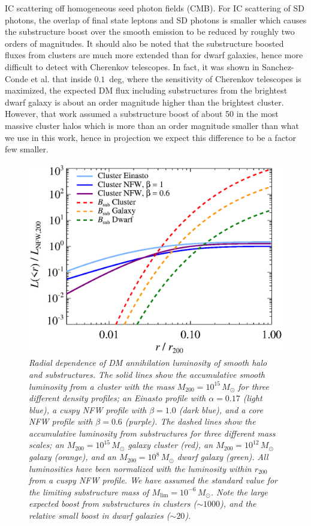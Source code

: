 \documentclass[10pt,aps,pra,reprint,amsmath,amsfonts,amssymb,showpacs,nofootinbib,floatfix]{revtex4-1}
\newcommand{\rmn}{\mathrm}
\newcommand{\msun}{M_\odot}
\newcommand{\rvir}{r_{200}}
\newcommand{\mvir}{M_{200}}
\begin{document}
IC scattering off homogeneous seed photon fields (CMB). For IC
scattering of SD photons, the overlap of final state leptons and SD
photons is smaller which causes the substructure boost over the smooth
emission to be reduced by roughly two orders of magnitudes. It should
also be noted that the substructure boosted fluxes from clusters are
much more extended than for dwarf galaxies, hence more difficult to
detect with Cherenkov telescopes. In fact, it was shown in
Sanchez-Conde et al. \cite{2011arXiv1104.3530S} that inside $0.1$~deg,
where the sensitivity of Cherenkov telescopes is maximized, the
expected DM flux including substructures from the brightest dwarf
galaxy is about an order magnitude higher than the brightest
cluster. However, that work assumed a substructure boost of about 50
in the most massive cluster halos which is more than an order
magnitude smaller than what we use in this work, hence in projection
we expect this difference to be a factor few smaller.

\begin{figure}%
 \includegraphics[width=0.99\columnwidth]{figures/dens.prof.eps}
 \caption{\it Radial dependence of DM annihilation luminosity of
   smooth halo and substructures. The solid lines show the
   accumulative smooth luminosity from a cluster with the mass
   $\mvir=10^{15}\,\msun$ for three different density profiles; an
   Einasto profile with $\alpha=0.17$ (light blue), a cuspy NFW
   profile with $\beta=1.0$ (dark blue), and a core NFW profile with
   $\beta=0.6$ (purple). The dashed lines show the accumulative
   luminosity from substructures for three different mass scales; an
   $\mvir=10^{15}\,\msun$ galaxy cluster (red), an
   $\mvir=10^{12}\,\msun$ galaxy (orange), and an
   $\mvir=10^{8}\,\msun$ dwarf galaxy (green). All luminosities have
   been normalized with the luminosity within $\rvir$ from a cuspy NFW
   profile. We have assumed the standard value for the limiting
   substructure mass of $M_\rmn{lim}=10^{-6}\,\msun$. Note the large
   expected boost from substructures in clusters ($\sim1000$), and the
   relative small boost in dwarf galaxies ($\sim20$).}
 \label{fig:radial_lum}
\end{figure}
\end{document}
